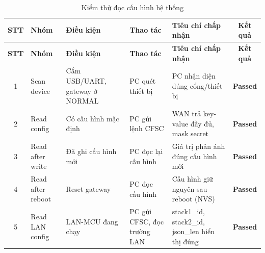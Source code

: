         \begin{longtable}{|c|p{2cm}|p{3.5cm}|p{2.5cm}|p{4cm}|c|}
            \caption{Kiểm thử đọc cấu hình hệ thống}
            \label{tab:test_read_config} \\
            \hline
            \textbf{STT} & \textbf{Nhóm} & \textbf{Điều kiện} & \textbf{Thao tác} & \textbf{Tiêu chí chấp nhận} & \textbf{Kết quả} \\ \hline
            \endfirsthead

            \hline
            \textbf{STT} & \textbf{Nhóm} & \textbf{Điều kiện} & \textbf{Thao tác} & \textbf{Tiêu chí chấp nhận} & \textbf{Kết quả} \\ \hline
            \endhead

            \hline
            \endfoot
            \endlastfoot

            1 & Scan device & Cắm USB/UART, gateway ở NORMAL & PC quét thiết bị & PC nhận diện đúng cổng/thiết bị & \textcolor{modern_blue}{\textbf{Passed}} \\ \hline
            2 & Read config & Có cấu hình mặc định & PC gửi lệnh CFSC & WAN trả key-value đầy đủ, mask secret & \textcolor{modern_blue}{\textbf{Passed}} \\ \hline
            3 & Read after write & Đã ghi cấu hình mới & PC đọc lại cấu hình & Giá trị phản ánh đúng cấu hình mới & \textcolor{modern_blue}{\textbf{Passed}} \\ \hline
            4 & Read after reboot & Reset gateway & PC đọc cấu hình & Cấu hình giữ nguyên sau reboot (NVS) & \textcolor{modern_blue}{\textbf{Passed}} \\ \hline
            5 & Read LAN config & LAN-MCU đang chạy & PC gửi CFSC, đọc trường LAN & stack1\_id, stack2\_id, json\_len hiển thị đúng & \textcolor{modern_blue}{\textbf{Passed}} \\ \hline
        \end{longtable}

